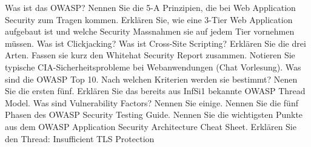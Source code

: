 \documentclass[ngerman,a4paper,12pt]{scrreprt}
\begin{document}
\olR
	\li Was ist das OWASP?
	\li Nennen Sie die 5-A Prinzipien, die bei Web Application Security zum Tragen kommen.
	\li Erklären Sie, wie eine 3-Tier Web Application aufgebaut ist und welche Security Massnahmen sie auf jedem Tier vornehmen müssen.
	\li Was ist Clickjacking?
	\li Was ist Cross-Site Scripting? Erklären Sie die drei Arten.
	\li Fassen sie kurz den Whitehat Security Report zusammen.
	\li Notieren Sie typische CIA-Sicherheitsprobleme bei Webanwendungen (Chat Vorlesung).
	\li Was sind die OWASP Top 10. Nach welchen Kriterien werden sie bestimmt? Nenen Sie die ersten fünf.
	\li Erklären Sie das bereits aus InfSi1 bekannte OWASP Thread Model.
	\li Was sind Vulnerability Factors? Nennen Sie einige.
	\li Nennen Sie die fünf Phasen des OWASP Security Testing Guide.
	\li Nennen Sie die wichtigsten Punkte aus dem OWASP Application Security Architecture Cheat Sheet.
	\li Erklären Sie den Thread: Insufficient TLS Protection
\olS
\end{document}

